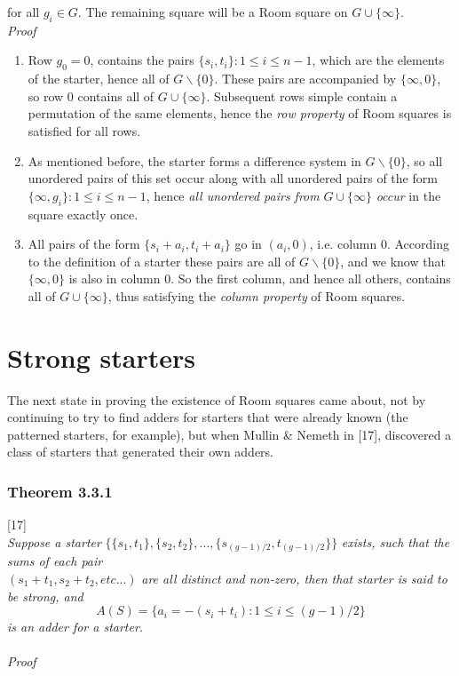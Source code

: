 \documentclass[
  12pt,
  a4paper]{book}
\begin{document}
for all \(g_i \in G\). The remaining square will be a Room square on
\(G \cup \{\infty\}\).\\
\emph{Proof}

\begin{enumerate}
\def\labelenumi{\arabic{enumi}.}
\item
  Row \(g_0=0\), contains the pairs \(\{s_i,t_i\}:1 \leq i \leq n-1\),
  which are the elements of the starter, hence all of
  \(G \backslash \{0\}\). These pairs are accompanied by
  \(\{\infty,0\}\), so row 0 contains all of \(G \cup \{\infty\}\).
  Subsequent rows simple contain a permutation of the same elements,
  hence the \emph{row property} of Room squares is satisfied for all
  rows.
\item
  As mentioned before, the starter forms a difference system in
  \(G \backslash \{0\}\), so all unordered pairs of this set occur along
  with all unordered pairs of the form
  \(\{\infty,g_i\}: 1 \leq i \leq n-1\), hence \emph{all unordered pairs
  from} \(G \cup \{\infty\}\) \emph{occur} in the square exactly once.
\item
  All pairs of the form \(\{s_i+a_i,t_i+a_i\}\) go in \((a_i,0)\), i.e.
  column 0. According to the definition of a starter these pairs are all
  of \(G \backslash \{0\}\), and we know that \(\{\infty,0\}\) is also
  in column 0. So the first column, and hence all others, contains all
  of \(G \cup \{\infty\}\), thus satisfying the \emph{column property}
  of Room squares.
\end{enumerate}

\hypertarget{strong-starters}{%
\section{Strong starters}\label{strong-starters}}

The next state in proving the existence of Room squares came about, not
by continuing to try to find adders for starters that were already known
(the patterned starters, for example), but when Mullin \& Nemeth in
{[}17{]}, discovered a class of starters that generated their own
adders.

\hypertarget{theorem-3.3.1}{%
\subsubsection{Theorem 3.3.1}\label{theorem-3.3.1}}

{[}17{]}\\
\emph{Suppose a starter}
\(\{\{s_1,t_1\},\{s_2,t_2\},...,\{s_{(g-1)/2},t_{(g-1)/2}\}\}\)
\emph{exists, such that the sums of each pair}\\
\((s_1+t_1,s_2+t_2, etc...)\) \emph{are all distinct and non-zero, then
that starter is said to be strong, and}
\[A(S)=\{a_i = -(s_i+t_i):1 \leq i \leq (g-1)/2\}\] \emph{is an adder
for a starter.\\
~\\
Proof}
\end{document}
